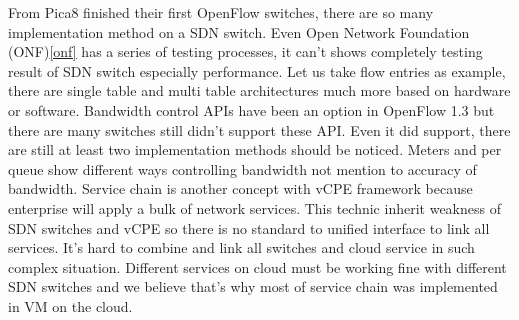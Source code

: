 \documentclass[journal]{IEEEtran}
\begin{document}
From Pica8 \cite{pica8-switch} finished their first OpenFlow switches, there are so many implementation method on a SDN switch. Even Open Network Foundation (ONF)\ref{onf} has a series of testing processes, it can’t shows completely testing result of SDN switch especially performance. Let us take flow entries as example, there are single table and multi table architectures much more based on hardware or software. Bandwidth control APIs have been an option in OpenFlow 1.3 but there are many switches still didn’t support these API. Even it did support, there are still at least two implementation methods should be noticed. Meters and per queue show different ways controlling bandwidth not mention to accuracy of bandwidth.
Service chain \cite{service-chain} is another concept with vCPE framework because enterprise will apply a bulk of network services. This technic inherit weakness of SDN switches and vCPE so there is no standard to unified interface to link all services. It’s hard to combine and link all switches and cloud service in such complex situation. Different services on cloud must be working fine with different SDN switches and we believe that’s why most of service chain was implemented in VM on the cloud.
\end{document}
